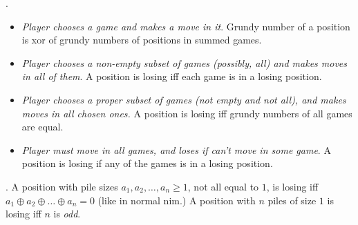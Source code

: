 .

\vspace{-4mm}
\begin{itemize}
  \item
    \emph{Player chooses a game and makes a move in it}.
    Grundy number of a position is xor of grundy numbers of positions in summed games.
  \item
    \emph{Player chooses a non-empty subset of games (possibly, all) and makes moves in all of them}.
    A position is losing iff each game is in a losing position.
  \item
    \emph{Player chooses a proper subset of games (not empty and not all),
        and makes moves in all chosen ones.}
    A position is losing iff grundy numbers of all games are equal.
  \item
    \emph{Player must move in all games, and loses if can't move in some game}.
    A position is losing if any of the games is in a losing position.
\end{itemize}

\vspace{-3mm}

.
A position with pile sizes $a_1, a_2, \dots, a_n \ge 1$,
not all equal to $1$, is losing iff $a_1 \oplus a_2 \oplus \dots \oplus a_n = 0$
(like in normal nim.)
A position with $n$ piles of size $1$ is losing iff $n$ is \emph{odd}.